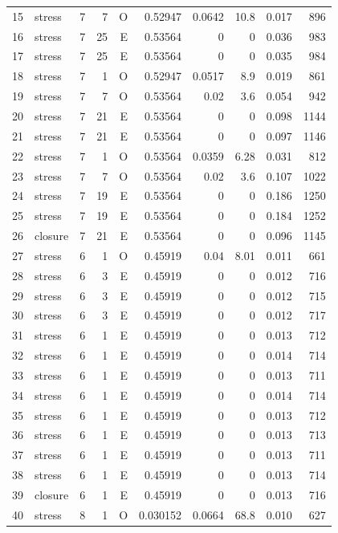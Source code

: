 \begin{longtable}{rlrrrrrrrr}
15 & stress & 7 & 7 & O & 0.52947 & 0.0642 & 10.8 & 0.017 & 896 \\
16 & stress & 7 & 25 & E & 0.53564 & 0 & 0 & 0.036 & 983 \\
17 & stress & 7 & 25 & E & 0.53564 & 0 & 0 & 0.035 & 984 \\
18 & stress & 7 & 1 & O & 0.52947 & 0.0517 & 8.9 & 0.019 & 861 \\
19 & stress & 7 & 7 & O & 0.53564 & 0.02 & 3.6 & 0.054 & 942 \\
20 & stress & 7 & 21 & E & 0.53564 & 0 & 0 & 0.098 & 1144 \\
21 & stress & 7 & 21 & E & 0.53564 & 0 & 0 & 0.097 & 1146 \\
22 & stress & 7 & 1 & O & 0.53564 & 0.0359 & 6.28 & 0.031 & 812 \\
23 & stress & 7 & 7 & O & 0.53564 & 0.02 & 3.6 & 0.107 & 1022 \\
24 & stress & 7 & 19 & E & 0.53564 & 0 & 0 & 0.186 & 1250 \\
25 & stress & 7 & 19 & E & 0.53564 & 0 & 0 & 0.184 & 1252 \\
26 & closure & 7 & 21 & E & 0.53564 & 0 & 0 & 0.096 & 1145 \\
27 & stress & 6 & 1 & O & 0.45919 & 0.04 & 8.01 & 0.011 & 661 \\
28 & stress & 6 & 3 & E & 0.45919 & 0 & 0 & 0.012 & 716 \\
29 & stress & 6 & 3 & E & 0.45919 & 0 & 0 & 0.012 & 715 \\
30 & stress & 6 & 3 & E & 0.45919 & 0 & 0 & 0.012 & 717 \\
31 & stress & 6 & 1 & E & 0.45919 & 0 & 0 & 0.013 & 712 \\
32 & stress & 6 & 1 & E & 0.45919 & 0 & 0 & 0.014 & 714 \\
33 & stress & 6 & 1 & E & 0.45919 & 0 & 0 & 0.013 & 711 \\
34 & stress & 6 & 1 & E & 0.45919 & 0 & 0 & 0.014 & 714 \\
35 & stress & 6 & 1 & E & 0.45919 & 0 & 0 & 0.013 & 712 \\
36 & stress & 6 & 1 & E & 0.45919 & 0 & 0 & 0.013 & 713 \\
37 & stress & 6 & 1 & E & 0.45919 & 0 & 0 & 0.013 & 711 \\
38 & stress & 6 & 1 & E & 0.45919 & 0 & 0 & 0.013 & 714 \\
39 & closure & 6 & 1 & E & 0.45919 & 0 & 0 & 0.013 & 716 \\
40 & stress & 8 & 1 & O & 0.030152 & 0.0664 & 68.8 & 0.010 & 627 \\

\end{longtable}
